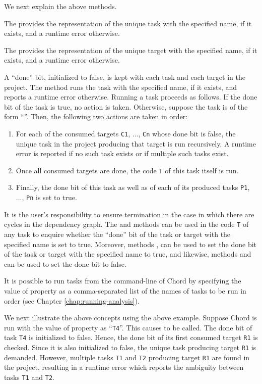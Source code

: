 We next explain the above methods.

The  provides the representation
of the unique task with the specified name, if it exists,
and a runtime error otherwise.

The  provides the representation
of the unique target with the specified name, if it exists,
and a runtime error otherwise.

A ``done'' bit, initialized to false, is kept with each task and each target in the project. 
The  method runs the task with the specified name, if it exists,
and reports a runtime error otherwise.  Running a task proceeds as follows.
If the done bit of the task is true, no action is taken.  Otherwise, 
suppose the task is of the form ``''.  Then,
the following two actions are taken in order:

\begin{enumerate}
\item
For each of the consumed targets {\tt C1}, ..., {\tt Cn} 
whose done bit is false, the unique task in the project producing that target 
is run recursively.
A runtime error is reported if no such task exists or if multiple such tasks exist.
\item
Once all consumed targets are done, the code {\tt T} of this task itself
is run.
\item
Finally, the done bit of this task as well as of each of its produced tasks
{\tt P1}, ..., {\tt Pn} is set to true.
\end{enumerate}

It is the user's responsibility to ensure termination in the case in which there are
cycles in the dependency graph.  The  and 
methods can be used in the code {\tt T} of any task to enquire
whether the ``done'' bit of the task or target with the specified name is set to true.
Moreover, methods ,  can be used to set
the done bit of the task or target with the specified name to true, and likewise,
methods  and  can be used
to set the done bit to false.

It is possible to run tasks from the command-line of Chord by specifying the value of property
 as a comma-separated list of the names of tasks to be run in order
(see Chapter \ref{chap:running-analysis}).

We next illustrate the above concepts using the above example.
Suppose Chord is run with the value of property  as ``{\tt T4}''.
This causes  to be called.  The done bit of task {\tt T4} is initialized to false.
Hence, the done bit of its first consumed target {\tt R1} is checked.
Since it is also initialized to false, the unique task producing
target {\tt R1} is demanded.  However, multiple tasks {\tt T1} and {\tt T2} 
producing target {\tt R1} are found in the project, resulting in a runtime error which
reports the ambiguity between tasks {\tt T1} and {\tt T2}.

